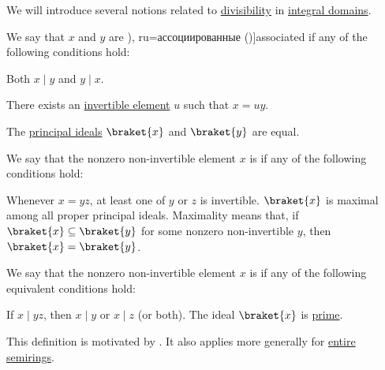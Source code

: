 \begin{definition}\label{def:domain_divisibility}
  We will introduce several notions related to \hyperref[def:semiring_divisibility]{divisibility} in \hyperref[def:integral_domain]{integral domains}.

  \begin{thmenum}
     We say that \( x \) and \( y \) are \term[bg=асоциирани (\cite[142]{ГеновМиховскиМоллов1991Алгебра}), ru=ассоциированные (\cite[118]{Винберг2014КурсАлгебры})]{associated} if any of the following conditions hold:
    \begin{thmenum}
       Both \( x \mid y \) and \( y \mid x \).

       There exists an \hyperref[def:semiring_divisibility/invertible]{invertible element} \( u \) such that \( x = uy \).

       The \hyperref[def:semiring_ideal/principal]{principal ideals} \( \braket{ x } \) and \( \braket{ y } \) are equal.
    \end{thmenum}

     We say that the nonzero non-invertible element \( x \) is  if any of the following conditions hold:
    \begin{thmenum}
       Whenever \( x = yz \), at least one of \( y \) or \( z \) is invertible.
       \( \braket{ x } \) is maximal among all proper principal ideals. Maximality means that, if \( \braket{ x } \subseteq \braket{ y } \) for some nonzero non-invertible \( y \), then \( \braket{ x } = \braket{ y } \).
    \end{thmenum}

     We say that the nonzero non-invertible element \( x \) is  if any of the following equivalent conditions hold:
    \begin{thmenum}
       If \( x \mid yz \), then \( x \mid y \) or \( x \mid z \) (or both).
       The ideal \( \braket{ x } \) is \hyperref[def:semiring_ideal/prime]{prime}.
    \end{thmenum}

    This definition is motivated by . It also applies more generally for \hyperref[def:entire_semiring]{entire semirings}.
  \end{thmenum}
\end{definition}
